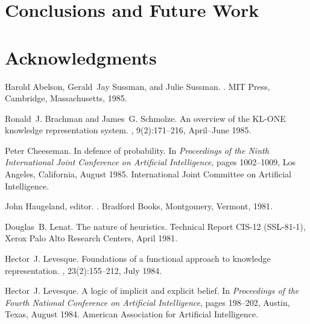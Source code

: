 \documentclass{article}
\begin{document}
\section{Conclusions and Future Work}
\label{Section:Conclusion}

\section*{Acknowledgments}


%
%
\begin{thebibliography}{}

Harold Abelson, Gerald~Jay Sussman, and Julie Sussman.
.
\newblock MIT Press, Cambridge, Massachusetts, 1985.

Ronald~J. Brachman and James~G. Schmolze.
\newblock An overview of the {KL-ONE} knowledge representation system.
, 9(2):171--216, April--June 1985.

Peter Cheeseman.
\newblock In defence of probability.
\newblock In {\em Proceedings of the Ninth International Joint Conference on
  Artificial Intelligence}, pages 1002--1009, Los Angeles, California, August
  1985. International Joint Committee on Artificial Intelligence.

John Haugeland, editor.
.
\newblock Bradford Books, Montgomery, Vermont, 1981.

Douglas~B. Lenat.
\newblock The nature of heuristics.
\newblock Technical Report CIS-12 (SSL-81-1), Xerox Palo Alto Research Centers,
  April 1981.

Hector~J. Levesque.
\newblock Foundations of a functional approach to knowledge representation.
, 23(2):155--212, July 1984.

Hector~J. Levesque.
\newblock A logic of implicit and explicit belief.
\newblock In {\em Proceedings of the Fourth National Conference on Artificial
  Intelligence}, pages 198--202, Austin, Texas, August 1984. American
  Association for Artificial Intelligence.

\end{thebibliography}
\end{document}
